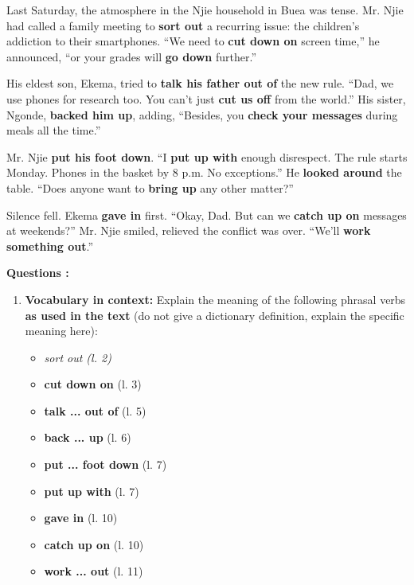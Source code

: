 \documentclass[11pt]{article}
\newcommand{\eng}[1]{\ifmmode\text{\textit{#1}}\else\begingroup\selectlanguage{english}\itshape #1\endgroup\fi}
\begin{document}
\begin{exercice}
\begin{textebox}
Last Saturday, the atmosphere in the Njie household in Buea was tense. Mr. Njie had called a family meeting to \textbf{sort out} a recurring issue: the children's addiction to their smartphones. ``We need to \textbf{cut down on} screen time,'' he announced, ``or your grades will \textbf{go down} further.''

His eldest son, Ekema, tried to \textbf{talk his father out of} the new rule. ``Dad, we use phones for research too. You can't just \textbf{cut us off} from the world.'' His sister, Ngonde, \textbf{backed him up}, adding, ``Besides, you \textbf{check your messages} during meals all the time.''

Mr. Njie \textbf{put his foot down}. ``I \textbf{put up with} enough disrespect. The rule starts Monday. Phones in the basket by 8 p.m. No exceptions.'' He \textbf{looked around} the table. ``Does anyone want to \textbf{bring up} any other matter?''

Silence fell. Ekema \textbf{gave in} first. ``Okay, Dad. But can we \textbf{catch up on} messages at weekends?'' Mr. Njie smiled, relieved the conflict was over. ``We'll \textbf{work something out}.''
\end{textebox}

\textbf{Questions :}

\begin{enumerate}
\item \textbf{Vocabulary in context:} Explain the meaning of the following phrasal verbs \textbf{as used in the text} (do not give a dictionary definition, explain the specific meaning here):
      \begin{itemize}
      \item \eng{sort out} (l. 2)
      \item \textbf{cut down on} (l. 3)
      \item \textbf{talk ... out of} (l. 5)
      \item \textbf{back ... up} (l. 6)
      \item \textbf{put ... foot down} (l. 7)
      \item \textbf{put up with} (l. 7)
      \item \textbf{gave in} (l. 10)
      \item \textbf{catch up on} (l. 10)
      \item \textbf{work ... out} (l. 11)
      \end{itemize}


\end{enumerate}
\end{exercice}
\end{document}
